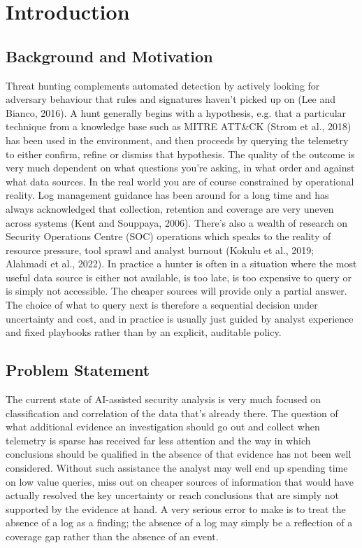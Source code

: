 \documentclass[a4paper,11pt]{article}
\begin{document}
\section{Introduction}
\subsection{Background and Motivation}
Threat hunting complements automated detection by actively looking for adversary behaviour that rules and signatures haven't picked up on (Lee and Bianco, 2016). A hunt generally begins with a hypothesis, e.g. that a particular technique from a knowledge base such as MITRE ATT\&CK (Strom et al., 2018) has been used in the environment, and then proceeds by querying the telemetry to either confirm, refine or dismiss that hypothesis. The quality of the outcome is very much dependent on what questions you're asking, in what order and against what data sources. In the real world you are of course constrained by operational reality. Log management guidance has been around for a long time and has always acknowledged that collection, retention and coverage are very uneven across systems (Kent and Souppaya, 2006). There's also a wealth of research on Security Operations Centre (SOC) operations which speaks to the reality of resource pressure, tool sprawl and analyst burnout (Kokulu et al., 2019; Alahmadi et al., 2022). In practice a hunter is often in a situation where the most useful data source is either not available, is too late, is too expensive to query or is simply not accessible. The cheaper sources will provide only a partial answer. The choice of what to query next is therefore a sequential decision under uncertainty and cost, and in practice is usually just guided by analyst experience and fixed playbooks rather than by an explicit, auditable policy.\par
\subsection{Problem Statement}
The current state of AI-assisted security analysis is very much focused on classification and correlation of the data that's already there. The question of what additional evidence an investigation should go out and collect when telemetry is sparse has received far less attention and the way in which conclusions should be qualified in the absence of that evidence has not been well considered. Without such assistance the analyst may well end up spending time on low value queries, miss out on cheaper sources of information that would have actually resolved the key uncertainty or reach conclusions that are simply not supported by the evidence at hand. A very serious error to make is to treat the absence of a log as a finding; the absence of a log may simply be a reflection of a coverage gap rather than the absence of an event.\par
\end{document}
